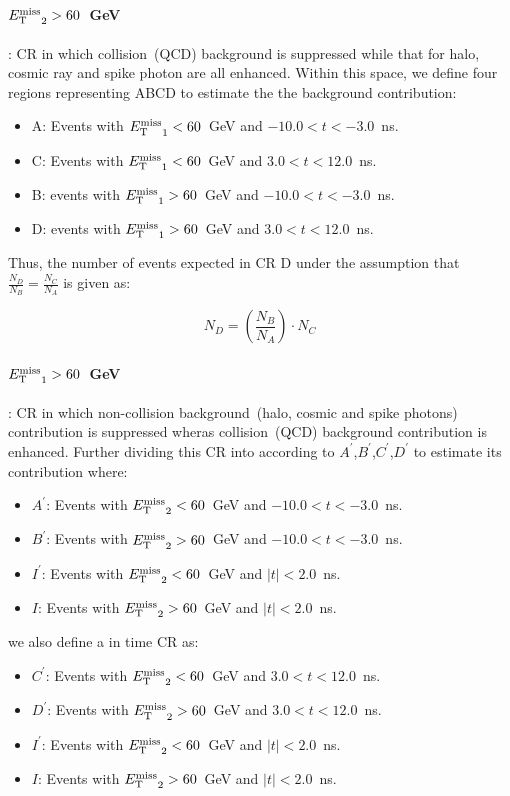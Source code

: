 \paragraph*{${E_{\mathrm{T}}^{\text{miss}}}_{2} > 60$~GeV } : CR in which collision~(QCD) background is suppressed while that for halo, cosmic ray and spike photon are all enhanced.
Within this space, we define four regions representing ABCD to estimate the the background contribution:
\begin{itemize}
\item A: Events with ${E_{\mathrm{T}}^{\text{miss}}}_{1} < 60$~GeV and $ -10.0 < t < -3.0$~ns.
\item C: Events with ${E_{\mathrm{T}}^{\text{miss}}}_{1} < 60$~GeV and $3.0 < t < 12.0$~ns.
\item B: events with ${E_{\mathrm{T}}^{\text{miss}}}_{1} > 60$~GeV and $-10.0 < t < -3.0$~ns.
\item D: events with ${E_{\mathrm{T}}^{\text{miss}}}_{1} > 60$~GeV and $3.0 < t <  12.0$~ns.
\end{itemize}
Thus, the number of events expected in CR D under the assumption that $\frac{N_{D}}{N_{B}} = \frac{N_{C}}{N_{A}}$  is given as:

\begin{equation}
N_{D} = \left(\frac{N_{B}}{N_{A}} \right)\cdot N_{C}
\end{equation}

\paragraph*{${E_{\mathrm{T}}^{\text{miss}}}_{1} > 60$~GeV }: CR in which non-collision background~(halo, cosmic and spike photons) contribution is suppressed wheras collision~(QCD) background contribution is enhanced.
Further dividing this CR into according to $A^{\prime}$,$B^{\prime}$,$C^{\prime}$,$D^{\prime}$ to estimate its contribution where:
\begin{itemize}
\item $A^{\prime}$: Events with ${E_{\mathrm{T}}^{\text{miss}}}_{2} < 60$~GeV and $-10.0 < t < -3.0$~ns.
\item $B^{\prime}$: Events with ${E_{\mathrm{T}}^{\text{miss}}}_{2} > 60$~GeV and $-10.0 < t < -3.0$~ns.
\item $I^{\prime}$: Events with ${E_{\mathrm{T}}^{\text{miss}}}_{2} < 60$~GeV and $|t| < 2.0$~ns.
\item $I$: Events with ${E_{\mathrm{T}}^{\text{miss}}}_{2} > 60$~GeV and $|t| < 2.0$~ns.
\end{itemize}
we also define a in time CR as:
\begin{itemize}
\item $C^{\prime}$: Events with ${E_{\mathrm{T}}^{\text{miss}}}_{2} < 60$~GeV and $ 3.0 < t <  12.0$~ns.
 \item $D^{\prime}$: Events with ${E_{\mathrm{T}}^{\text{miss}}}_{2} > 60$~GeV and $3.0 < t <  12.0$~ns.
 \item $I^{\prime}$: Events with ${E_{\mathrm{T}}^{\text{miss}}}_{2} < 60$~GeV and $|t| < 2.0$~ns.
\item $I$: Events with ${E_{\mathrm{T}}^{\text{miss}}}_{2} > 60$~GeV and $|t| < 2.0$~ns.
\end{itemize}

